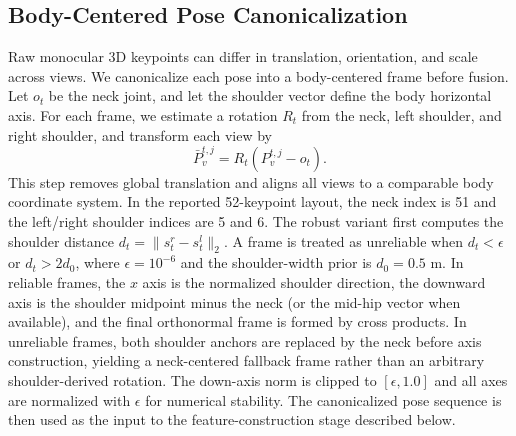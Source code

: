 \documentclass[runningheads]{llncs}
\begin{document}
\subsection{Body-Centered Pose Canonicalization}
Raw monocular 3D keypoints can differ in translation, orientation, and scale across views. We canonicalize each pose into a body-centered frame before fusion. Let $o_t$ be the neck joint, and let the shoulder vector define the body horizontal axis. For each frame, we estimate a rotation $R_t$ from the neck, left shoulder, and right shoulder, and transform each view by
\begin{equation}
\bar{P}_{v}^{t,j}=R_t\left(P_{v}^{t,j}-o_t\right).
\label{equ:canon}
\end{equation}
This step removes global translation and aligns all views to a comparable body coordinate system. In the reported 52-keypoint layout, the neck index is 51 and the left/right shoulder indices are 5 and 6. The robust variant first computes the shoulder distance $d_t=\|s^r_t-s^l_t\|_2$. A frame is treated as unreliable when $d_t<\epsilon$ or $d_t>2d_0$, where $\epsilon=10^{-6}$ and the shoulder-width prior is $d_0=0.5$ m. In reliable frames, the $x$ axis is the normalized shoulder direction, the downward axis is the shoulder midpoint minus the neck (or the mid-hip vector when available), and the final orthonormal frame is formed by cross products. In unreliable frames, both shoulder anchors are replaced by the neck before axis construction, yielding a neck-centered fallback frame rather than an arbitrary shoulder-derived rotation. The down-axis norm is clipped to $[\epsilon,1.0]$ and all axes are normalized with $\epsilon$ for numerical stability. The canonicalized pose sequence is then used as the input to the feature-construction stage described below.
\end{document}

